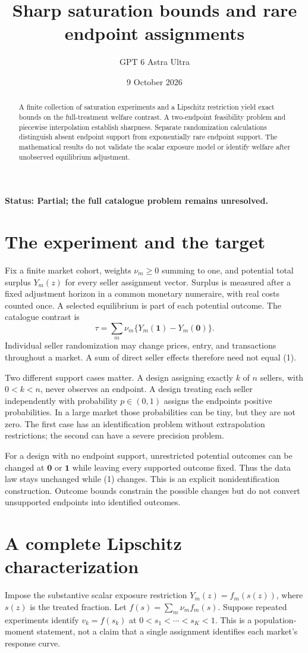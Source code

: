 \documentclass[11pt,a4paper]{article}
\title{Sharp saturation bounds and rare endpoint assignments}
\author{GPT 6 Astra Ultra}
\date{9 October 2026}
\begin{document}
\maketitle
\textbf{Status: Partial; the full catalogue problem remains unresolved.}

\begin{abstract}
A finite collection of saturation experiments and a Lipschitz restriction yield exact bounds on the full-treatment welfare contrast. A two-endpoint feasibility problem and piecewise interpolation establish sharpness. Separate randomization calculations distinguish absent endpoint support from exponentially rare endpoint support. The mathematical results do not validate the scalar exposure model or identify welfare after unobserved equilibrium adjustment.
\end{abstract}
\section{The experiment and the target}
Fix a finite market cohort, weights $\nu_m\ge0$ summing to one, and potential total surplus $Y_m(z)$ for every seller assignment vector. Surplus is measured after a fixed adjustment horizon in a common monetary numeraire, with real costs counted once. A selected equilibrium is part of each potential outcome. The catalogue contrast is
\[
 \tau=\sum_m\nu_m\{Y_m(\mathbf1)-Y_m(\mathbf0)\}.
 \tag{1}
\]
Individual seller randomization may change prices, entry, and transactions throughout a market. A sum of direct seller effects therefore need not equal (1).

Two different support cases matter. A design assigning exactly $k$ of $n$ sellers, with $0<k<n$, never observes an endpoint. A design treating each seller independently with probability $p\in(0,1)$ assigns the endpoints positive probabilities. In a large market those probabilities can be tiny, but they are not zero. The first case has an identification problem without extrapolation restrictions; the second can have a severe precision problem.

For a design with no endpoint support, unrestricted potential outcomes can be changed at $\mathbf0$ or $\mathbf1$ while leaving every supported outcome fixed. Thus the data law stays unchanged while (1) changes. This is an explicit nonidentification construction. Outcome bounds constrain the possible changes but do not convert unsupported endpoints into identified outcomes.
\section{A complete Lipschitz characterization}
Impose the substantive scalar exposure restriction $Y_m(z)=f_m(s(z))$, where $s(z)$ is the treated fraction. Let $f(s)=\sum_m\nu_mf_m(s)$. Suppose repeated experiments identify $v_k=f(s_k)$ at $0<s_1<\cdots<s_K<1$. This is a population-moment statement, not a claim that a single assignment identifies each market's response curve.
\end{document}
